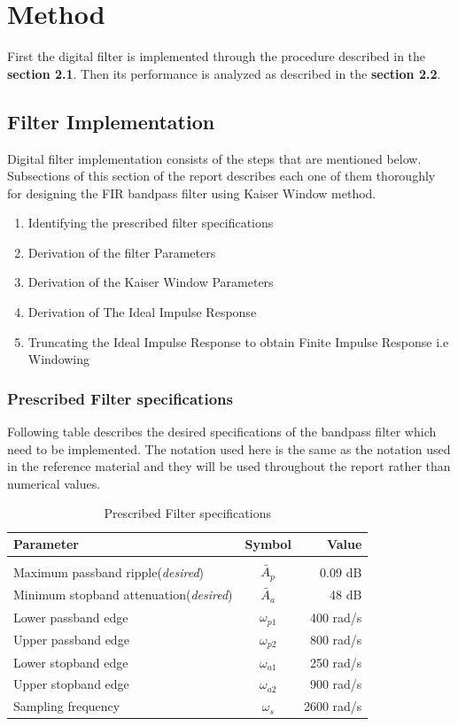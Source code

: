 \documentclass[a4paper,11pt]{article}%
\begin{document}
\section{Method}

First the digital filter is implemented through the procedure described in the \textbf{section 2.1}. Then its performance is analyzed as described in the \textbf{section 2.2}.

\subsection{Filter Implementation}
Digital filter implementation consists of the steps that are mentioned below. Subsections of this section of the report describes each one of them thoroughly for designing the FIR bandpass filter using Kaiser Window method.

\begin{enumerate}[\hspace{1cm}1.]
	\item Identifying the prescribed filter specifications
	\item Derivation of the filter Parameters
	\item Derivation of the Kaiser Window Parameters
	\item Derivation of The Ideal Impulse Response
	\item Truncating the Ideal Impulse Response to obtain Finite Impulse Response i.e Windowing
\end{enumerate}

\subsubsection{Prescribed Filter specifications}
Following table describes the desired specifications of the bandpass filter which need to be implemented. The notation used here is the same as the notation used in the reference material\cite{antonio} and they will be used throughout the report rather than numerical values.

\begin{table}[!h]
	\centering

	\begin{tabular}{l c r}
		\hline
		\textbf{Parameter}& \textbf{Symbol}&\textbf{Value}\\\hline
		&&\\
Maximum passband ripple(\textit{desired})&$\tilde{A_p}$&0.09 dB\\
Minimum stopband attenuation(\textit{desired})&$\tilde{A_a}$&48 dB\\
Lower passband edge&$\omega_{p1}$&400 rad/s\\
Upper passband edge&$\omega_{p2}$&800 rad/s\\
Lower stopband edge&$\omega_{a1}$&250 rad/s\\
Upper stopband edge&$\omega_{a2}$&900 rad/s\\
Sampling frequency&$\omega_s$&2600 rad/s\\
\hline\hline
	\end{tabular}
	\caption{Prescribed Filter specifications}
	\label{filterspecs}
\end{table}
\end{document}
